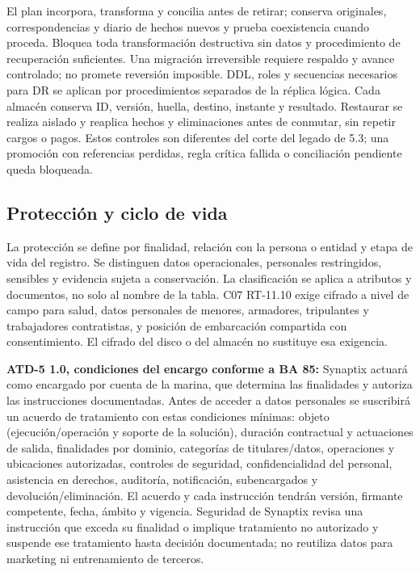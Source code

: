 El plan incorpora, transforma y concilia antes de retirar; conserva originales, correspondencias y diario de hechos nuevos y prueba coexistencia cuando proceda. Bloquea toda transformación destructiva sin datos y procedimiento de recuperación suficientes. Una migración irreversible requiere respaldo y avance controlado; no promete reversión imposible. DDL, roles y secuencias necesarios para DR se aplican por procedimientos separados de la réplica lógica. Cada almacén conserva ID, versión, huella, destino, instante y resultado. Restaurar se realiza aislado y reaplica hechos y eliminaciones antes de conmutar, sin repetir cargos o pagos. Estos controles son diferentes del corte del legado de 5.3; una promoción con referencias perdidas, regla crítica fallida o conciliación pendiente queda bloqueada.

\subsection{Protección y ciclo de vida}
\label{subsec:sd5_proteccion}

La protección se define por finalidad, relación con la persona o entidad y etapa de vida del registro. Se distinguen datos operacionales, personales restringidos, sensibles y evidencia sujeta a conservación. La clasificación se aplica a atributos y documentos, no solo al nombre de la tabla. C07 RT-11.10 exige cifrado a nivel de campo para salud, datos personales de menores, armadores, tripulantes y trabajadores contratistas, y posición de embarcación compartida con consentimiento. El cifrado del disco o del almacén no sustituye esa exigencia.


\textbf{ATD-5 1.0, condiciones del encargo conforme a BA 85:}
\label{subsec:sd5_encargo_ba85}
Synaptix actuará como encargado por cuenta de la marina, que determina las finalidades y autoriza las instrucciones documentadas. Antes de acceder a datos personales se suscribirá un acuerdo de tratamiento con estas condiciones mínimas: objeto (ejecución/operación y soporte de la solución), duración contractual y actuaciones de salida, finalidades por dominio, categorías de titulares/datos, operaciones y ubicaciones autorizadas, controles de seguridad, confidencialidad del personal, asistencia en derechos, auditoría, notificación, subencargados y devolución/eliminación. El acuerdo y cada instrucción tendrán versión, firmante competente, fecha, ámbito y vigencia. Seguridad de Synaptix revisa una instrucción que exceda su finalidad o implique tratamiento no autorizado y suspende ese tratamiento hasta decisión documentada; no reutiliza datos para marketing ni entrenamiento de terceros.

